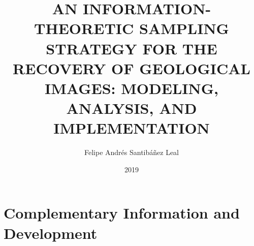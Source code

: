 \documentclass[upright, contnum]{umemoria}
\author{Felipe Andrés Santibáñez Leal}
\title{AN INFORMATION-THEORETIC SAMPLING STRATEGY FOR THE RECOVERY OF GEOLOGICAL IMAGES: MODELING, ANALYSIS, AND IMPLEMENTATION}
\date{2019}
\begin{document}
\frontmatter
\maketitle

\begin{abstractesp}

\end{abstractesp}

\begin{abstract}

\end{abstract}

\begin{dedicatoria} %

\end{dedicatoria}

\begin{thanks} %

\end{thanks}
\cleardoublepage

\tableofcontents
\listoftables %
\listoffigures %
\mainmatter










\appendix




\chapter{Complementary Information and Development}

\label{App_BASICS}


\label{App_QE}


\clearpage




\clearpage
{}
\printnomenclature[2cm] %
\clearpage
\printglossary[style=mylong,type=\acronymtype,title=Special Terms, toctitle=List of terms]
\end{document}
